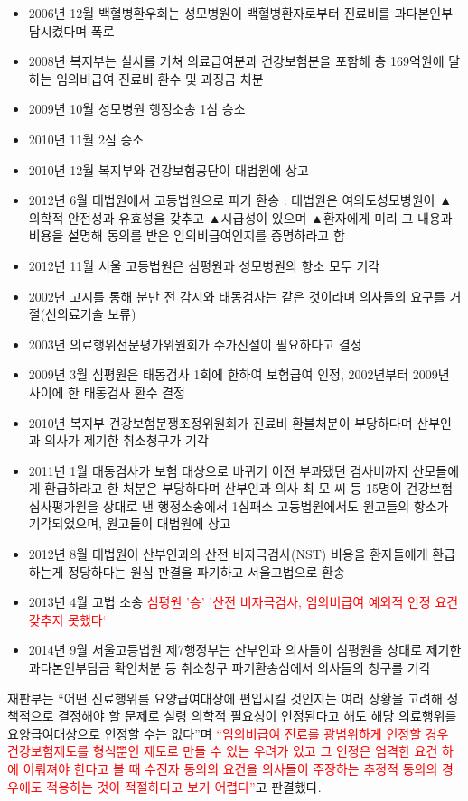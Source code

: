 \begin{itemize}\tightlist
\item 2006년 12월 백혈병환우회는 성모병원이 백혈병환자로부터 진료비를 과다본인부담시켰다며 폭로 
\item 2008년 복지부는 실사를 거쳐 의료급여분과 건강보험분을 포함해 총 169억원에 달하는 임의비급여 진료비 환수 및 과징금 처분
\item 2009년 10월 성모병원 행정소송 1심 승소
\item 2010년 11월 2심 승소
\item 2010년 12월 복지부와 건강보험공단이 대법원에 상고
\item 2012년 6월 대법원에서 고등법원으로 파기 환송
:   대법원은 여의도성모병원이 ▲의학적 안전성과 유효성을 갖추고 ▲시급성이 있으며 ▲환자에게 미리 그 내용과 비용을 설명해 동의를 받은 임의비급여인지를 증명하라고 함
\item 2012년 11월 서울 고등법원은 심평원과 성모병원의 항소 모두 기각
\end{itemize}

\begin{itemize}\tightlist
\item 2002년 고시를 통해 분만 전 감시와 태동검사는 같은 것이라며 의사들의 요구를 거절(신의료기술 보류)
\item 2003년 의료행위전문평가위원회가 수가신설이 필요하다고 결정
\item 2009년 3월 심평원은 태동검사 1회에 한하여 보험급여 인정, 2002년부터 2009년 사이에 한 태동검사 환수 결정
\item 2010년 복지부 건강보험분쟁조정위원회가 진료비 환불처분이 부당하다며 산부인과 의사가 제기한 취소청구가 기각
\item 2011년 1월 태동검사가 보험 대상으로 바뀌기 이전 부과됐던 검사비까지 산모들에게 환급하라고 한 처분은 부당하다며 산부인과 의사 최 모 씨 등 15명이 건강보험심사평가원을 상대로 낸 행정소송에서 1심패소 고등법원에서도 원고들의 항소가 기각되었으며,  원고들이 대법원에 상고
\item 2012년 8월 대법원이 산부인과의 산전 비자극검사(NST) 비용을 환자들에게 환급하는게 정당하다는 원심 판결을 파기하고 서울고법으로 환송
\item 2013년 4월 고법 소송  \textcolor{red}{심평원 '승' '산전 비자극검사, 임의비급여 예외적 인정 요건 갖추지 못했다‘}
\item 2014년 9월  서울고등법원 제7행정부는 산부인과 의사들이 심평원을 상대로 제기한 과다본인부담금 확인처분 등 취소청구 파기환송심에서 의사들의 청구를 기각
\end{itemize}
\begin{center}
\parbox[t]{.8\textwidth}{재판부는 “어떤 진료행위를 요양급여대상에 편입시킬 것인지는 여러 상황을 고려해 정책적으로 결정해야 할 문제로 설령  의학적 필요성이 인정된다고 해도 해당 의료행위를 요양급여대상으로 인정할 수는 없다”며 \textcolor{red}{“임의비급여 진료를 광범위하게 인정할 경우 건강보험제도를 형식뿐인 제도로 만들 수 있는 우려가 있고 그 인정은 엄격한 요건 하에 이뤄져야 한다고 볼 때 수진자 동의의 요건을 의사들이 주장하는 추정적 동의의 경우에도 적용하는 것이 적절하다고 보기 어렵다”}고 판결했다.}
\end{center}

